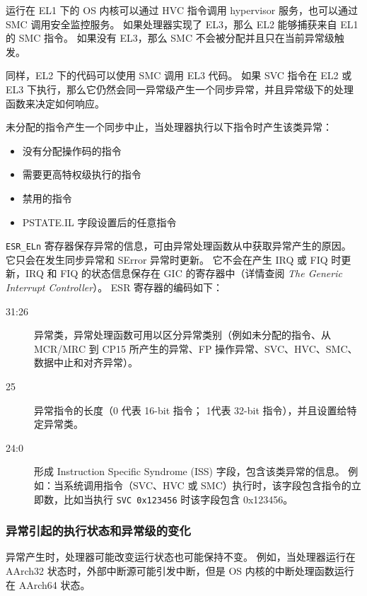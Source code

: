 运行在 EL1 下的 OS 内核可以通过 HVC 指令调用 hypervisor 服务，也可以通过 SMC 调用安全监控服务。
如果处理器实现了 EL3，那么 EL2 能够捕获来自 EL1 的 SMC 指令。
如果没有 EL3，那么 SMC 不会被分配并且只在当前异常级触发。

同样，EL2 下的代码可以使用 SMC 调用 EL3 代码。
如果 SVC 指令在 EL2 或 EL3 下执行，那么它仍然会同一异常级产生一个同步异常，并且异常级下的处理函数来决定如何响应。


未分配的指令产生一个同步中止，当处理器执行以下指令时产生该类异常：

\begin{itemize}
  \item 没有分配操作码的指令
  \item 需要更高特权级执行的指令
  \item 禁用的指令
  \item PSTATE.IL 字段设置后的任意指令
\end{itemize}


\lstinline!ESR_ELn! 寄存器保存异常的信息，可由异常处理函数从中获取异常产生的原因。
它只会在发生同步异常和 SError 异常时更新。
它不会在产生 IRQ 或 FIQ 时更新，IRQ 和 FIQ 的状态信息保存在 GIC 的寄存器中（详情查阅 \textit{The Generic Interrupt Controller}）。
ESR 寄存器的编码如下：

\begin{description}
  \item[31:26] 异常类，异常处理函数可用以区分异常类别（例如未分配的指令、从 MCR/MRC 到 CP15 所产生的异常、FP 操作异常、SVC、HVC、SMC、数据中止和对齐异常）。
  \item[25] 异常指令的长度（0 代表 16-bit 指令；
    1代表 32-bit 指令），并且设置给特定异常类。
  \item[24:0] 形成 Instruction Specific Syndrome (ISS) 字段，包含该类异常的信息。
    例如：当系统调用指令（SVC、HVC 或 SMC）执行时，该字段包含指令的立即数，比如当执行 \lstinline!SVC 0x123456! 时该字段包含 0x123456。
\end{description}

\subsubsection{异常引起的执行状态和异常级的变化}

异常产生时，处理器可能改变运行状态也可能保持不变。
例如，当处理器运行在 AArch32 状态时，外部中断源可能引发中断，但是 OS 内核的中断处理函数运行在 AArch64 状态。

